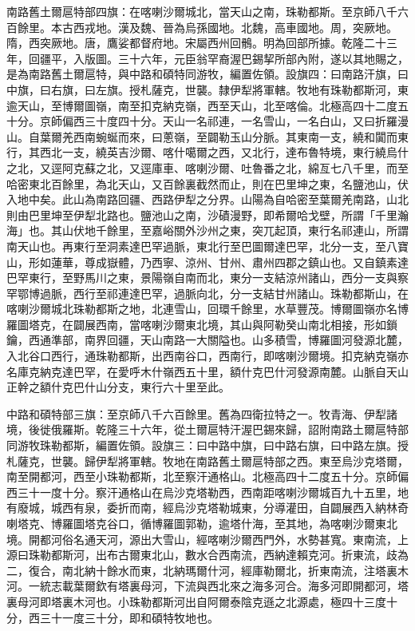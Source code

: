 \begin{pinyinscope}
南路舊土爾扈特部四旗：在喀喇沙爾城北，當天山之南，珠勒都斯。至京師八千六百餘里。本古西戎地。漢及魏、晉為烏孫國地。北魏，高車國地。周，突厥地。隋，西突厥地。唐，鷹娑都督府地。宋屬西州回鶻。明為回部所據。乾隆二十三年，回疆平，入版圖。三十六年，元臣翁罕裔渥巴錫挈所部內附，遂以其地賜之，是為南路舊土爾扈特，與中路和碩特同游牧，編置佐領。設旗四：曰南路汗旗，曰中旗，曰右旗，曰左旗。授札薩克，世襲。隸伊犁將軍轄。牧地有珠勒都斯河，東逾天山，至博爾圖嶺，南至扣克納克嶺，西至天山，北至喀倫。北極高四十二度五十分。京師偏西三十度四十分。天山一名祁連，一名雪山，一名白山，又曰折羅漫山。自葉爾羌西南蜿蜒而來，曰蔥嶺，至闢勒玉山分脈。其東南一支，繞和闐而東行，其西北一支，繞英吉沙爾、喀什噶爾之西，又北行，達布魯特境，東行繞烏什之北，又逕阿克蘇之北，又逕庫車、喀喇沙爾、吐魯番之北，綿亙七八千里，而至哈密東北百餘里，為北天山，又百餘裏截然而止，則在巴里坤之東，名鹽池山，伏入地中矣。此山為南路回疆、西路伊犁之分界。山陽為自哈密至葉爾羌南路，山北則由巴里坤至伊犁北路也。鹽池山之南，沙磧漫野，即希爾哈戈壁，所謂「千里瀚海」也。其山伏地千餘里，至嘉峪關外沙州之東，突兀起頂，東行名祁連山，所謂南天山也。再東行至洞素達巴罕過脈，東北行至巴圖爾達巴罕，北分一支，至八寶山，形如蓮華，尊成嶽體，乃西寧、涼州、甘州、肅州四郡之鎮山也。又自鎮素達巴罕東行，至野馬川之東，景陽嶺自南而北，東分一支結涼州諸山，西分一支與察罕鄂博過脈，西行至祁連達巴罕，過脈向北，分一支結甘州諸山。珠勒都斯山，在喀喇沙爾城北珠勒都斯之地，北連雪山，回環千餘里，水草豐茂。博爾圖嶺亦名博羅圖塔克，在闢展西南，當喀喇沙爾東北境，其山與阿勒癸山南北相接，形如鎖鑰，西通準部，南界回疆，天山南路一大關隘也。山多積雪，博羅圖河發源北麓，入北谷口西行，通珠勒都斯，出西南谷口，西南行，即喀喇沙爾境。扣克納克嶺亦名庫克納克達巴罕，在愛呼木什嶺西五十里，額什克巴什河發源南麓。山脈自天山正幹之額什克巴什山分支，東行六十里至此。

中路和碩特部三旗：至京師八千六百餘里。舊為四衛拉特之一。牧青海、伊犁諸境，後徙俄羅斯。乾隆三十六年，從土爾扈特汗渥巴錫來歸，詔附南路土爾扈特部同游牧珠勒都斯，編置佐領。設旗三：曰中路中旗，曰中路右旗，曰中路左旗。授札薩克，世襲。歸伊犁將軍轄。牧地在南路舊土爾扈特部之西。東至烏沙克塔爾，南至開都河，西至小珠勒都斯，北至察汗通格山。北極高四十二度五十分。京師偏西三十一度十分。察汗通格山在烏沙克塔勒西，西南距喀喇沙爾城百九十五里，地有廢城，城西有泉，委折而南，經烏沙克塔勒城東，分導灌田，自闢展西入納林奇喇塔克、博羅圖塔克谷口，循博羅圖郭勒，逾塔什海，至其地，為喀喇沙爾東北境。開都河俗名通天河，源出大雪山，經喀喇沙爾西門外，水勢甚寬。東南流，上源曰珠勒都斯河，出布古爾東北山，數水合西南流，西納達賴克河。折東流，歧為二，復合，南北納十餘水而東，北納瑪爾什河，經庫勒爾北，折東南流，注塔裏木河。一統志載葉爾欽有塔裏母河，下流與西北來之海多河合。海多河即開都河，塔裏母河即塔裏木河也。小珠勒都斯河出自阿爾泰陰克遜之北源處，極四十三度十分，西三十一度三十分，即和碩特牧地也。


\end{pinyinscope}
